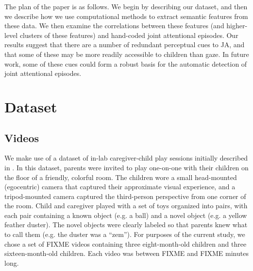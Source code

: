 \documentclass[10pt,letterpaper]{article}
\begin{document}
The plan of the paper is as follows. We begin by describing our dataset, and then we describe how we use computational methods to extract semantic features from these data. We then examine the correlations between these features (and higher-level clusters of these features) and hand-coded joint attentional episodes. Our results suggest that there are a number of redundant perceptual cues to JA, and that some of these may be more readily accessible to children than gaze. In future work, some of these cues could form a robust basis for the automatic detection of joint attentional episodes.


\section{Dataset}

\subsection{Videos}

We make use of a dataset of in-lab caregiver-child play sessions initially described in . In this dataset, parents were invited to play one-on-one with their children on the floor of a friendly, colorful room. The children wore a small head-mounted (egocentric) camera that captured their approximate visual experience, and a tripod-mounted camera captured the third-person perspective from one corner of the room. Child and caregiver played with a set of toys organized into pairs, with each pair containing a known object (e.g. a ball) and a novel object (e.g. a yellow feather duster). The novel objects were clearly labeled so that parents knew what to call them (e.g. the duster was a ``zem''). For purposes of the current study, we chose a set of FIXME videos containing three eight-month-old children and three sixteen-month-old children. Each video was between FIXME and FIXME minutes long. 
\end{document}
